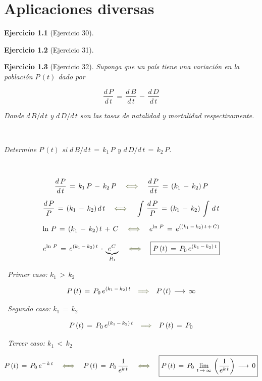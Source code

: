 \documentclass[a4paper,11pt]{book}
\newtheorem{ejer}{Ejercicio}[section]
\begin{document}
\chapter{Aplicaciones diversas} 

\begin{ejer}[Ejercicio 30] 

\end{ejer} 

\begin{ejer}[Ejercicio 31] 

\end{ejer} 

\begin{ejer}[Ejercicio 32]
 
Suponga que un país tiene una variación en la población $P\,(t)$ dado por
 
$$\boxed{\dfrac{d\,P}{d\,t}\,=\,\dfrac{d\,B}{d\,t}\,-\,\dfrac{d\,D}{d\,t}}$$ 
 
Donde $d\,B/d\,t$ y $d\,D/d\,t$ son las tasas de natalidad y mortalidad respectivamente.
 
\
 
Determine $P\,(t)$ si $d\,B/d\,t\,=\,k_{1}\,P$ y $d\,D/d\,t\,=\,k_{2}\,P$.
 
\ 
 
 
$$\dfrac{d\,P}{d\,t}\,=\,k_{1}\,P\,-\,k_{2}\,P \quad \textcolor{armygreen}{\iff} \quad \dfrac{d\,P}{d\,t}\,=\,(k_{1}\,-\,k_{2})\,P$$
 
$$\dfrac{d\,P}{P}\,=\,(k_{1}\,-\,k_{2})\,d\,t \quad \textcolor{armygreen}{\iff} \quad \int\,\dfrac{d\,P}{P}\,=\,(k_{1}\,-\,k_{2})\,\int\,d\,t$$
 
$$\ln\,P\,=\,(k_{1}\,-\,k_{2})\,t\,+\,C \quad \textcolor{armygreen}{\iff} \quad e^{\ln\,P}\,=\,e^{((k_{1}\,-\,k_{2})\,t\,+\,C ) }$$
 
$$e^{\ln\,P}\,=\,e^{(k_{1}\,-\,k_{2})\,t}\,\cdot\,\underbrace{e^{C}}_{P_{0}}\quad \textcolor{armygreen}{\iff} \quad \boxed{P\,(t)\,=\,P_{0}\,e^{(k_{1}\,-\,k_{2})\,t}}$$
 
\textcolor{armygreen}{\Writinghand}\, Primer caso: $\boxed{k_{1}\,>\,k_{2}}$
 
$$P\,(t)\,=\,P_{0}\,e^{(k_{1}\,-\,k_{2})\,t} \quad \textcolor{armygreen}{\Longrightarrow} \quad P\,(t) \, \longrightarrow \, \infty$$
 
\textcolor{armygreen}{\Writinghand}\, Segundo caso: $\boxed{k_{1}\,=\,k_{2}}$
 
$$P\,(t)\,=\,P_{0}\,e^{(k_{1}\,-\,k_{2})\,t} \quad \textcolor{armygreen}{\Longrightarrow} \quad P\,(t)\,=\,P_{0}$$
 
\textcolor{armygreen}{\Writinghand}\, Tercer caso: $\boxed{k_{1}\,<\,k_{2}}$
 
$$P\,(t)\,=\,P_{0}\,e^{-\,k\,t} \quad \textcolor{armygreen}{\iff} \quad P\,(t)\,=\,P_{0}\,\dfrac{1}{e^{k\,t}} \quad \textcolor{armygreen}{\iff} \quad \boxed{P\,(t)\,=\,P_{0}\,\lim_{t\,\rightarrow\,\infty}\,\left(\dfrac{1}{e^{k\,t}} \right) \, \longrightarrow \, 0}$$
 

\end{ejer} 
\end{document}
